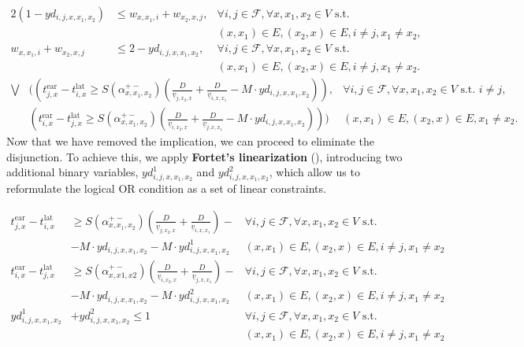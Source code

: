 \documentclass[../../thesis.tex]{subfiles}
\begin{document}
\begin{align}
    2(1-yd_{i,j,x,x_1,x_2}) &\leq w_{x,x_1,i} + w_{x_2,x,j},  
    &\forall i, j \in \mathcal{F}, \forall x, x_1, x_2 \in V\text { s.t. } 
    \nonumber\\
    && (x,x_1) \in E, (x_2,x) \in E, i \neq j, x_1 \neq x_2, \\
    w_{x,x_1,i} + w_{x_2,x,j} &\leq 2 - yd_{i,j,x,x_1,x_2},  
    &\forall i, j \in \mathcal{F}, \forall x, x_1, x_2 \in V\text { s.t. } 
    \nonumber\\
    && (x,x_1) \in E, (x_2,x) \in E, i \neq j, x_1 \neq x_2.
\end{align}
{\tiny
\begin{align}\label{eq:diverOR}
    \bigvee&
    \Bigg(\left(t^\text{ear}_{j,x}-t^\text{lat}_{i,x}\geq S(\alpha^{+-}_{x,x_1,x_2})\left(\frac{D}{\underline v_{j,x_2,x}} + \frac{D}{\underline v_{i,x,x_1}} - M \cdot yd_{i,j,x,x_1,x_2}\right)\right),
    & \forall i, j \in \mathcal{F}, \forall x,x_{1}, x_{2} \in V \text{ s.t. }i\neq j,\nonumber\\&
    \left(t^\text{ear}_{i,x}-t^\text{lat}_{j,x}\geq S(\alpha^{+-}_{x,x_1,x_2})\left(\frac{D}{\underline v_{i,x_2,x}}+\frac{D}{\underline v_{j,x,x_1}}- M \cdot yd_{i,j,x,x_1,x_2}\right)\right)\Bigg)
    &(x,x_{1}) \in E, (x_{2},x) \in E, x_1\neq x_2.
\end{align}
}
Now that we have removed the implication, we can proceed to eliminate the disjunction.  
To achieve this, we apply \textbf{Fortet's linearization} (\cite{fortet-1960}), introducing two additional binary variables, $yd^1_{i,j,x,x_1,x_2}$ and $yd^2_{i,j,x,x_1,x_2}$, which allow us to reformulate the logical OR condition as a set of linear constraints.

\begin{align}
    t^\text{ear}_{j,x}-t^\text{lat}_{i,x}&\geq S(\alpha^{+-}_{x,x_1,x_2})\left(\frac D{\underline v_{j,x_2,x}} 
    + \frac D{\underline v_{i,x,x_1}}\right)-
    &\forall i,j\in\mathcal F,\forall x,x_1,x_2\in V \text { s.t. }
    \nonumber\\
    &- M\cdot yd_{i,j,x,x_1,x_2}- M\cdot yd^1_{i,j,x,x_1,x_2} 
    & (x,x_1)\in E,(x_2,x)\in E, i\neq j, x_1\neq x_2\\
    t^\text{ear}_{i,x}-t^\text{lat}_{j,x}&\geq S(\alpha^{+-}_{x,x1,x2})\left(\frac D{\underline v_{i,x_2,x}}+
    \frac D{\underline v_{j,x,x_1}}\right)- 
    &\forall i,j\in\mathcal F,\forall x,x_1,x_2\in V \text { s.t. }
    \nonumber\\
    &- M\cdot yd_{i,j,x,x_1,x_2}- M\cdot yd^2_{i,j,x,x_1,x_2}
    &(x,x_1)\in E,(x_2,x)\in E, i\neq j, x_1\neq x_2\\
    yd^1_{i,j,x,x_1,x_2} &+ yd^2_{i,j,x,x_1,x_2}\leq 1&
    \forall i,j\in\mathcal F,\forall x,x_1,x_2\in V\text { s.t. }
    \nonumber\\&& (x,x_1)\in E,(x_2,x)\in E, i\neq j, x_1\neq x_2
\end{align}
\end{document}
